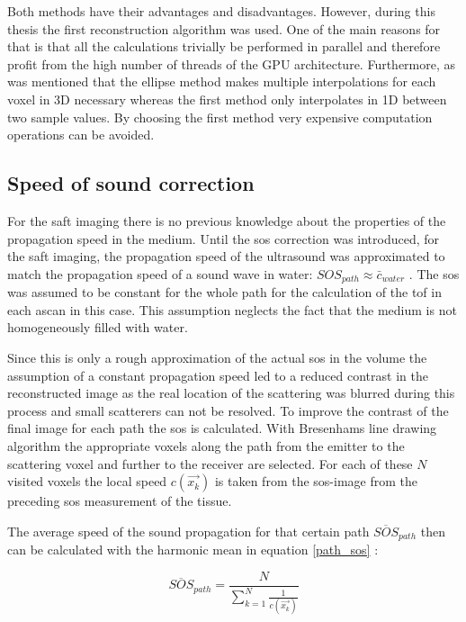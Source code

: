 Both methods have their advantages and disadvantages. However, during this thesis the first reconstruction algorithm was used. One of the main reasons for that is that all the calculations trivially be performed in parallel and therefore profit from the high number of threads of the GPU architecture. Furthermore, as was mentioned that the ellipse method makes multiple interpolations for each voxel in 3D necessary whereas the first method only interpolates in 1D between two sample values. By choosing the first method very expensive computation operations can be avoided.


\subsection{Speed of sound correction}
\label{sec:sos_correct}

For the \ac{saft} imaging there is no previous knowledge about the properties of the propagation speed in the medium. Until the \ac{sos} correction was introduced, for the \ac{saft} imaging, the propagation speed of the ultrasound was approximated to match the propagation speed of a sound wave in water: $SOS_{path} \approx  \bar{c}_{water}$  \cite{Kretzek2014GPUAberration}. The \ac{sos} was assumed to be constant for the whole path for the calculation of the \ac{tof} in each \ac{ascan} in this case. This assumption neglects the fact that the medium is not homogeneously filled with water. 

Since this is only a rough approximation of the actual \ac{sos} in the volume the assumption of a constant propagation speed led to a reduced contrast in the reconstructed image as the real location of the scattering was blurred during this process and small scatterers can not be resolved.
To improve the contrast of the final image for each path the \ac{sos} is calculated. With Bresenhams line drawing algorithm \cite{Bresenham2010AlgorithmPlotter} the appropriate voxels along the path from the emitter to the scattering voxel and further to the receiver are selected. For each of these $N$ visited voxels the local speed $c(\overrightarrow {x_k})$ is taken from the \ac{sos}-image from the preceding \ac{sos} measurement of the tissue.

The average speed of the sound propagation for that certain path $\overline{SOS}_{path}$ then can be calculated with the harmonic mean in equation \ref{path_sos} \cite{Kretzek2014GPUAberration}:

\begin{equation}
 \overline{SOS}_{path} = \frac{N}{\sum_{k=1}^{N}  \frac{1}{c(\overrightarrow {x_k})} } 
\label{path_sos}
\end{equation}

